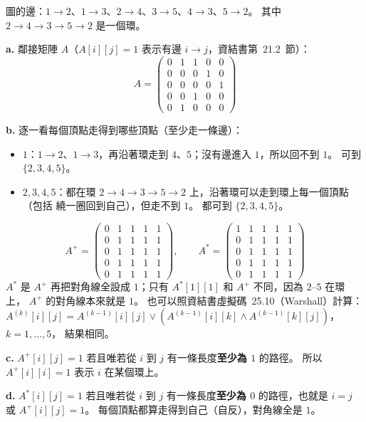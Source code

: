 \begin{pastsoln}
圖的邊：$1 \to 2$、$1 \to 3$、$2 \to 4$、$3 \to 5$、$4 \to 3$、$5 \to 2$。 其中
$2 \to 4 \to 3 \to 5 \to 2$ 是一個環。

\textbf{a.} 鄰接矩陣 $A$（$A[i][j] = 1$ 表示有邊 $i \to j$，資結書第~21.2~節）：
\[
A = \begin{pmatrix}
0 & 1 & 1 & 0 & 0 \\
0 & 0 & 0 & 1 & 0 \\
0 & 0 & 0 & 0 & 1 \\
0 & 0 & 1 & 0 & 0 \\
0 & 1 & 0 & 0 & 0
\end{pmatrix}
\]

\textbf{b.} 逐一看每個頂點走得到哪些頂點（至少走一條邊）：
\begin{itemize}
\item $1$：$1 \to 2$、$1 \to 3$，再沿著環走到 $4$、$5$；沒有邊進入 $1$，所以回不到 $1$。 可到 $\{2, 3, 4, 5\}$。
\item $2, 3, 4, 5$：都在環 $2 \to 4 \to 3 \to 5 \to 2$ 上，沿著環可以走到環上每一個頂點（包括
繞一圈回到自己），但走不到 $1$。 都可到 $\{2, 3, 4, 5\}$。
\end{itemize}
\[
A^{+} = \begin{pmatrix}
0 & 1 & 1 & 1 & 1 \\
0 & 1 & 1 & 1 & 1 \\
0 & 1 & 1 & 1 & 1 \\
0 & 1 & 1 & 1 & 1 \\
0 & 1 & 1 & 1 & 1
\end{pmatrix},
\qquad
A^{*} = \begin{pmatrix}
1 & 1 & 1 & 1 & 1 \\
0 & 1 & 1 & 1 & 1 \\
0 & 1 & 1 & 1 & 1 \\
0 & 1 & 1 & 1 & 1 \\
0 & 1 & 1 & 1 & 1
\end{pmatrix}
\]
$A^{*}$ 是 $A^{+}$ 再把對角線全設成 $1$；只有 $A^{*}[1][1]$ 和 $A^{+}$ 不同，因為 $2$--$5$ 在環上，
$A^{+}$ 的對角線本來就是 $1$。 也可以照資結書虛擬碼~25.10（Warshall）計算：
$A^{(k)}[i][j] = A^{(k-1)}[i][j] \lor (A^{(k-1)}[i][k] \land A^{(k-1)}[k][j])$，$k = 1, \ldots, 5$，
結果相同。

\textbf{c.} $A^{+}[i][j] = 1$ 若且唯若從 $i$ 到 $j$ 有一條長度\textbf{至少為 $1$} 的路徑。 所以
$A^{+}[i][i] = 1$ 表示 $i$ 在某個環上。

\textbf{d.} $A^{*}[i][j] = 1$ 若且唯若從 $i$ 到 $j$ 有一條長度\textbf{至少為 $0$} 的路徑，也就是
$i = j$ 或 $A^{+}[i][j] = 1$。 每個頂點都算走得到自己（自反），對角線全是 $1$。


\end{pastsoln}
